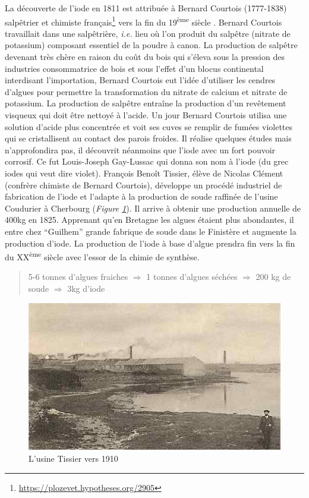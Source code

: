 \documentclass[
]{book}
\begin{document}
La découverte de l'iode en 1811 est attribuée à Bernard Courtois (1777-1838) salpêtrier et chimiste français\footnote{\url{https://plozevet.hypotheses.org/2905}} vers la fin du 19\textsuperscript{ème} siècle \citep{guitard1922}. Bernard Courtois travaillait dans une salpêtrière, \emph{i.e.} lieu où l'on produit du salpêtre (nitrate de potassium) composant essentiel de la poudre à canon. La production de salpêtre devenant très chère en raison du coût du bois qui s'éleva sous la pression des industries consommatrice de bois et sous l'effet d'un blocus continental interdisant l'importation, Bernard Courtois eut l'idée d'utiliser les cendres d'algues pour permettre la transformation du nitrate de calcium et nitrate de potassium.
La production de salpêtre entraîne la production d'un revêtement visqueux qui doit être nettoyé à l'acide. Un jour Bernard Courtois utilisa une solution d'acide plus concentrée et voit ses cuves se remplir de fumées violettes qui se cristallisent au contact des parois froides. Il réalise quelques études mais n'approfondira pas, il découvrit néanmoins que l'iode avec un fort pouvoir corrosif. Ce fut Louis-Joseph Gay-Lussac qui donna son nom à l'iode (du grec iodes qui veut dire violet).
François Benoît Tissier, élève de Nicolas Clément (confrère chimiste de Bernard Courtois), développe un procédé industriel de fabrication de l'iode et l'adapte à la production de soude raffinée de l'usine Coudurier à Cherbourg (\emph{Figure \ref{fig:tissier}}). Il arrive à obtenir une production annuelle de 400kg en 1825. Apprenant qu'en Bretagne les algues étaient plus abondantes, il entre chez ``Guilhem'' grande fabrique de soude dans le Finistère et augmente la production d'iode.
La production de l'iode à base d'algue prendra fin vers la fin du XX\textsuperscript{ème} siècle avec l'essor de la chimie de synthèse.

\begin{quote}
5-6 tonnes d'algues fraiches \(\Rightarrow\) 1 tonnes d'algues séchées \(\Rightarrow\) 200 kg de soude \(\Rightarrow\) 3kg d'iode
\end{quote}

\begin{figure}

{\centering \includegraphics[width=5.68in]{images/tissier} 

}

\caption{L'usine Tissier vers 1910}\label{fig:tissier}
\end{figure}
\end{document}
